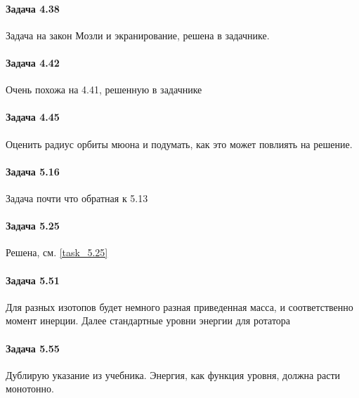 \documentclass[12pt]{article}
\begin{document}
\paragraph{Задача 4.38} Задача на закон Мозли и экранирование, решена в задачнике.
\paragraph{Задача 4.42} Очень похожа на 4.41, решенную в задачнике
\paragraph{Задача 4.45} Оценить радиус орбиты мюона и подумать, как это может повлиять на решение. 
\paragraph{Задача 5.16} Задача почти что обратная к 5.13
\paragraph{Задача 5.25} Решена, см. \ref{task_5.25}
\paragraph{Задача 5.51} Для разных изотопов будет немного разная приведенная масса, и соответственно момент инерции. Далее стандартные уровни энергии для ротатора
\paragraph{Задача 5.55} Дублирую указание из учебника. Энергия, как функция уровня, должна расти монотонно. 
\end{document}
